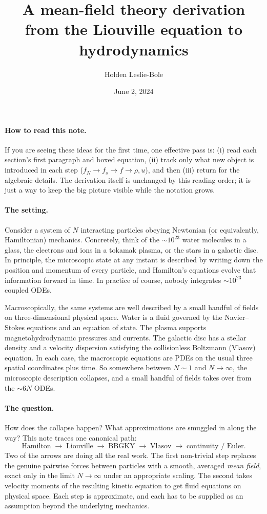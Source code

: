 \documentclass{article}
\title{A mean-field theory derivation from the Liouville equation to hydrodynamics}
\author{Holden Leslie-Bole}
\date{June 2, 2024}
\begin{document}
\maketitle

\paragraph{How to read this note.} If you are seeing these ideas for the first time, one effective pass is: (i) read each section's first paragraph and boxed equation, (ii) track only what new object is introduced in each step ($f_N \to f_s \to f \to \rho,u$), and then (iii) return for the algebraic details. The derivation itself is unchanged by this reading order; it is just a way to keep the big picture visible while the notation grows.

\paragraph{The setting.} Consider a system of \(N\) interacting particles obeying Newtonian (or equivalently, Hamiltonian) mechanics. Concretely, think of the \(\sim 10^{23}\) water molecules in a glass, the electrons and ions in a tokamak plasma, or the stars in a galactic disc. In principle, the microscopic state at any instant is described by writing down the position and momentum of every particle, and Hamilton's equations evolve that information forward in time. In practice of course, nobody integrates \(\sim 10^{23}\) coupled ODEs.

Macroscopically, the same systems are well described by a small handful of fields on three-dimensional physical space. Water is a fluid governed by the Navier--Stokes equations and an equation of state. The plasma supports magnetohydrodynamic pressures and currents. The galactic disc has a stellar density and a velocity dispersion satisfying the collisionless Boltzmann (Vlasov) equation. In each case, the macroscopic equations are PDEs on the usual three spatial coordinates plus time. So somewhere between \(N \sim 1\) and \(N \to \infty\), the microscopic description collapses, and a small handful of fields takes over from the \(\sim 6N\) ODEs.

\paragraph{The question.} How does the collapse happen? What approximations are smuggled in along the way? This note traces one canonical path:
\[
\text{Hamilton} \;\longrightarrow\; \text{Liouville} \;\longrightarrow\; \text{BBGKY} \;\longrightarrow\; \text{Vlasov} \;\longrightarrow\; \text{continuity / Euler.}
\]
Two of the arrows are doing all the real work. The first non-trivial step replaces the genuine pairwise forces between particles with a smooth, averaged \emph{mean field}, exact only in the limit \(N \to \infty\) under an appropriate scaling. The second takes velocity moments of the resulting kinetic equation to get fluid equations on physical space. Each step is approximate, and each has to be supplied as an assumption beyond the underlying mechanics.
\end{document}
